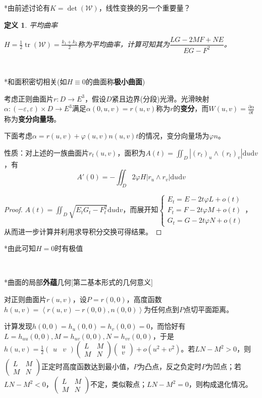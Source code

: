 \documentclass[a4paper,UTF8,fontset=windows]{ctexart}
\DeclareMathOperator{\tr}{tr}
\newtheorem{dfn}[thm]{定义}
\begin{document}
*由前述讨论有$K=\det(\mathcal{W})$，线性变换的另一个重要量？

\begin{dfn} 平均曲率

$H=\frac{1}{2}\tr(\mathcal{W})=\frac{k_1+k_2}{2}$称为平均曲率，计算可知其为$\dfrac{LG-2MF+NE}{EG-F^2}$。
\end{dfn}

\

*和面积密切相关(如$H\equiv0$的曲面称\textbf{极小曲面})

考虑正则曲面片$r:D\to E^3$，假设$D$紧且边界(分段)光滑。光滑映射$\alpha:(-\varepsilon,\varepsilon)\times D\to E^3$满足$\alpha(0,u,v)=r(u,v)$称为$r$的\textbf{变分}，而$W(u,v)=\frac{\partial\alpha}{\partial t}$称为\textbf{变分向量场}。

下面考虑$\alpha=r(u,v)+\varphi(u,v)n(u,v)t$的情况，变分向量场为$\varphi n$。

性质：对上述的一族曲面片$r_t(u,v)$，面积为$A(t)=\iint_D|(r_t)_u\wedge(r_t)_v|\mathrm{d}u\mathrm{d}v$，有$$A'(0)=-\iint_D2\varphi H|r_u\wedge r_v|\mathrm{d}u\mathrm{d}v$$

\begin{proof}
$A(t)=\iint_D\sqrt{E_tG_t-F_t^2}\mathrm{d}u\mathrm{d}v$，而展开知$\begin{cases}E_t=E-2t\varphi L+o(t)\\F_t=F-2t\varphi M+o(t)\\G_t=G-2t\varphi N+o(t)\end{cases}$，从而进一步计算并利用求导积分交换可得结果。
\end{proof}

*由此可知$H=0$时有极值

\

*曲面的局部\textbf{外蕴}几何[第二基本形式的几何意义]

对正则曲面片$r(u,v)$，设$P=r(0,0)$，高度函数$h(u,v)=\left<r(u,v)-r(0,0),n(0,0)\right>$为任何点到$P$点切平面距离。

计算发现$h(0,0)=h_u(0,0)=h_v(0,0)=0$，而恰好有$L=h_{uu}(0,0),M=h_{uv}(0,0),N=h_{vv}(0,0)$，于是$h(u,v)=\frac{1}{2}\begin{pmatrix}u&v\end{pmatrix}\begin{pmatrix}L&M\\M&N\end{pmatrix}\begin{pmatrix}u\\v\end{pmatrix}+o(u^2+v^2)$。若$LN-M^2>0$，则$\begin{pmatrix}L&M\\M&N\end{pmatrix}$正定时高度函数达到最小值，$P$为凸点，反之负定时$P$为凹点；若$LN-M^2<0$，$\begin{pmatrix}L&M\\M&N\end{pmatrix}$不定，类似鞍点；$LN-M^2=0$，则构成退化情况。
\end{document}
